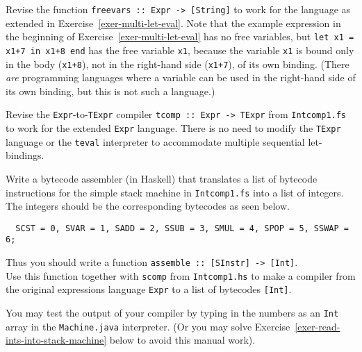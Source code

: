 \documentclass[a4paper]{article}
\begin{document}
\begin{exercise}\label{exer-multi-let-closed}
  Revise the function \texttt{freevars ::\ Expr -> [String]} to work
  for the language as extended in Exercise~\ref{exer-multi-let-eval}.
  Note that the example expression in the beginning of
  Exercise~\ref{exer-multi-let-eval} has no free variables, but
  \texttt{let x1 = x1+7 in x1+8 end} has the free variable
  \texttt{x1}, because the variable \texttt{x1} is bound only in the
  body (\texttt{x1+8}), not in the right-hand side (\texttt{x1+7}), of
  its own binding.  (There \emph{are} programming languages where a
  variable can be used in the right-hand side of its own binding, but
  this is not such a language.)
\end{exercise}


\begin{exercise}\label{exer-multi-let-tcomp}
  Revise the \texttt{Expr}-to-\texttt{TExpr} compiler \texttt{tcomp ::\ 
    Expr -> TExpr} from \texttt{Intcomp1.fs} to work for the extended
  \texttt{Expr} language.
  There is no need to modify the \texttt{TExpr} language or the
  \texttt{teval} interpreter to accommodate multiple sequential
  let-bindings.
\end{exercise}


\begin{exercise}\label{exer-comp-expr-to-ints}
  {\color{red}{This exercise uses the file Machine.java, but I've managed to translate the question such that the file isn't needed.}}  Write a bytecode assembler (in Haskell) that translates a list
  of bytecode instructions for the simple stack machine in
  \texttt{Intcomp1.fs} into a list of integers.  The integers should be
  the corresponding bytecodes as seen below.
  {\codesetup\begin{verbatim}
  SCST = 0, SVAR = 1, SADD = 2, SSUB = 3, SMUL = 4, SPOP = 5, SSWAP = 6;\end{verbatim}}
  \noindent 
  Thus you should write a function
  \texttt{assemble ::\ [SInstr] -> [Int]}.\\
  
  Use this function together with \texttt{scomp} from
  \texttt{Intcomp1.hs} to make a compiler from the original expressions
  language \texttt{Expr} to a list of bytecodes \texttt{[Int]}.
  
  You may test the output of your compiler by typing in the numbers as
  an \texttt{Int} array in the \texttt{Machine.java} interpreter.  (Or
  you may solve Exercise~\ref{exer-read-ints-into-stack-machine} below
  to avoid this manual work).
\end{exercise}
\end{document}
